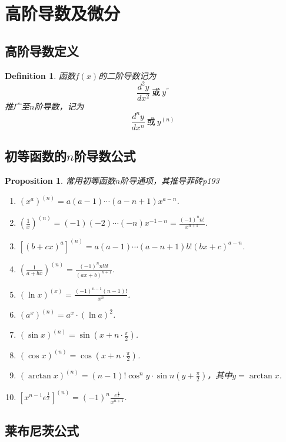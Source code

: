 \documentclass{article}
\newtheorem{proposition}[theorem]{Proposition}
\newtheorem{definition}[theorem]{Definition}
\begin{document}
\newpage
\section{高阶导数及微分}

\subsection{高阶导数定义}
\begin{definition}
\rm 函数$f(x)$的{\color{red}二阶导数}记为
$$
\frac{d^2y}{dx^2}~\text{或}~ y^{''}
$$
推广至$n$阶导数，记为
$$
\frac{d^ny}{dx^n}~\text{或}~ y^{(n)}
$$
\end{definition}

\newpage
\subsection{初等函数的$n$阶导数公式}

\begin{proposition} \rm 常用初等函数$n$阶导通项，{\color{blue}其推导菲砖p193}
\begin{enumerate} 
	\item $(x^a)^{(n)} = a(a-1)\cdots(a-n+1)x^{a-n}$.
	\item $\left(\frac{1}{x}\right)^{(n)} = (-1)(-2)\cdots(-n)x^{-1-n} = \frac{(-1)^n n!}{x^{n+1}}$.
	\item $\left[(b+cx)^a\right]^{(n)} = a(a-1)\cdots(a-n+1)b!(bx+c)^{a-n}$.
	\item $\left(\frac{1}{a+bx}\right)^{(n)} = \frac{(-1)^n n!b!}{(ax+b)^{n+1}}$.
	\item $(\ln x)^{(x)} = \frac{(-1)^{n-1}(n-1)!}{x^n}$.
	\item $(a^x)^{(n)} = a^x\cdot (\ln a)^2$.
	\item $(\sin x)^{(n)} = \sin (x+n\cdot\frac{\pi}{2})$.
	\item $(\cos x)^{(n)} = \cos (x+n\cdot\frac{\pi}{2})$.
	\item $(\arctan x)^{(n)} = (n-1)!\cos^n y\cdot\sin n(y+\frac{\pi}{2})$，其中$y = \arctan x$.
	\item $\left[ x^{n-1}e^\frac{1}{x}\right]^{(n)} = (-1)^n \frac{e^\frac{1}{x}}{x^{n+1}}$.
\end{enumerate}
\end{proposition}

\newpage
\subsection{莱布尼茨公式}
\end{document}

